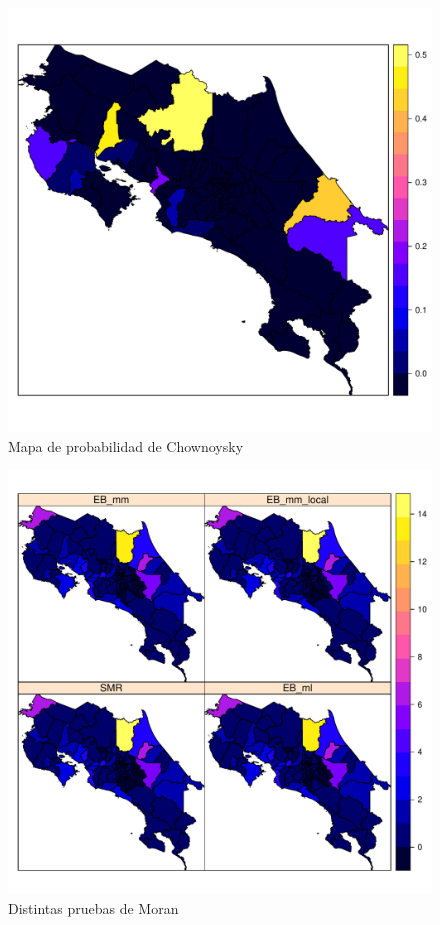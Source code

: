 \documentclass[12pt,a4paper]{article}
\begin{document}
\begin{figure}[hbtp]
\centering
\includegraphics[scale=0.75]{FA9.pdf}
\caption{Mapa de probabilidad de Chownoysky}
\end{figure}

\begin{figure}[hbtp]
\centering
\includegraphics[scale=0.75]{FA10.pdf}
\caption{Distintas pruebas de Moran}
\end{figure}



\end{document}
